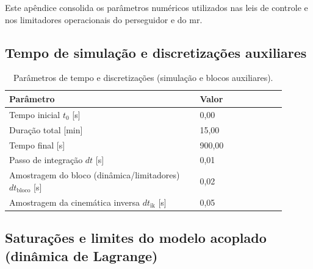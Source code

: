 
\label{ap:apendiceC_parametros_controle}

Este apêndice consolida os parâmetros numéricos utilizados nas leis de controle e nos limitadores operacionais do perseguidor e do \gls{mr}.

\subsection{Tempo de simulação e discretizações auxiliares}
\label{apC:tempo_dt}

\begin{table}[H]
\centering
\caption{Parâmetros de tempo e discretizações (simulação e blocos auxiliares).}
\label{tab:apC_tempo_dt}
\begin{tabular}{|p{0.62\linewidth}|p{0.28\linewidth}|}
\hline
\textbf{Parâmetro} & \textbf{Valor}\\
\hline
Tempo inicial $t_0$ [s] & 0,00\\
\hline
Duração total [min] & 15,00\\
\hline
Tempo final [s] & 900,00\\
\hline
Passo de integração $dt$ [s] & 0,01\\
\hline
Amostragem do bloco (dinâmica/limitadores) $dt_{\text{bloco}}$ [s] & 0,02\\
\hline
Amostragem da cinemática inversa $dt_{\text{ik}}$ [s] & 0,05\\
\hline
\end{tabular}
\end{table}

\subsection{Saturações e limites do modelo acoplado (dinâmica de Lagrange)}
\label{apC:saturacoes_lagrange}

